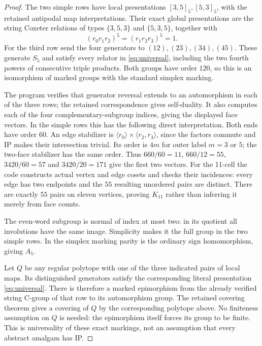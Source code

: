 \begin{proof}
The two simple rows have local presentations $[3,5]_5,[5,3]_5$, with the
retained antipodal map interpretations. Their exact global presentations
are the string Coxeter relations of types $\{3,5,3\}$ and $\{5,3,5\}$,
together with
\[
 (r_0r_1r_2)^5=(r_1r_2r_3)^5=1.
\]
For the third row send the four generators to $(12),(23),(34),(45)$.
These generate $S_5$ and satisfy every relator in
\eqref{eq:universal}, including the two fourth powers of consecutive
triple products. Both groups have order $120$, so this is an isomorphism
of marked groups with the standard simplex marking.

The program verifies that generator reversal extends to an automorphism
in each of the three rows; the retained correspondence gives self-duality.
It also computes each of the four complementary-subgroup indices, giving
the displayed face vectors. In the simple rows this has the following
direct interpretation. Both ends have order $60$. An edge stabilizer is
$\langle r_0\rangle\times\langle r_2,r_3\rangle$, since the factors
commute and IP makes their intersection trivial. Its order is $4m$ for
outer label $m=3$ or $5$; the two-face stabilizer has the same order.
Thus $660/60=11$, $660/12=55$, $3420/60=57$ and $3420/20=171$ give the
first two vectors. For the 11-cell the code constructs actual vertex and
edge cosets and checks their incidences: every edge has two endpoints and
the $55$ resulting unordered pairs are distinct. There are exactly $55$
pairs on eleven vertices, proving $K_{11}$ rather than inferring it merely
from face counts.

The even-word subgroup is normal of index at most two: in its quotient
all involutions have the same image. Simplicity makes it the full group
in the two simple rows. In the simplex marking parity is the ordinary
sign homomorphism, giving $A_5$.

Let $Q$ be any regular polytope with one of the three indicated pairs of
local maps. Its distinguished generators satisfy the corresponding
literal presentation \eqref{eq:universal}. There is therefore a marked
epimorphism from the already verified string C-group of that row to its
automorphism group. The retained covering theorem gives a covering of
$Q$ by the corresponding polytope above. No finiteness assumption on $Q$
is needed: the epimorphism itself forces its group to be finite. This is
universality of these exact markings, not an assumption that every
abstract amalgam has IP.
\end{proof}

